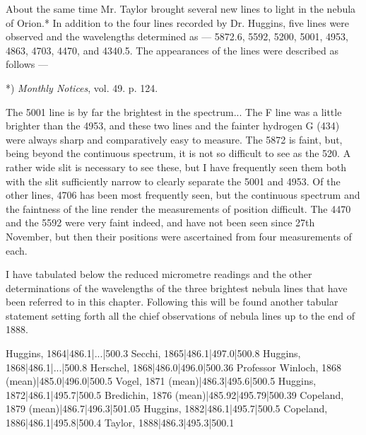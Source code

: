 \documentclass[a4paper, 12pt, oneside, polutonikogreek, english]{article}
\begin{document}
About the same time Mr. Taylor brought several new lines to light in the nebula of Orion.* In addition to the four lines recorded by Dr. Huggins, five lines were observed and the wavelengths determined as --- 5872.6, 5592, 5200, 5001, 4953, 4863, 4703, 4470, and 4340.5. The appearances of the lines were described as follows ---

*) \emph{Monthly Notices}, vol. 49. p. 124.

The 5001 line is by far the brightest in the spectrum... The F line was a little brighter than the 4953, and these two lines and the fainter hydrogen G (434) were always sharp and comparatively easy to measure. The 5872 is faint, but, being beyond the continuous spectrum, it is not so difficult to see as the 520. A rather wide slit is necessary to see these, but I have frequently seen them both with the slit sufficiently narrow to clearly separate the 5001 and 4953. Of the other lines, 4706 has been most frequently seen, but the continuous spectrum and the faintness of the line render the measurements of position difficult. The 4470 and the 5592 were very faint indeed, and have not been seen since 27th November, but then their positions were ascertained from four measurements of each.

I have tabulated below the reduced micrometre readings and the other determinations of the wavelengths of the three brightest nebula lines that have been referred to in this chapter. Following this will be found another tabular statement setting forth all the chief observations of nebula lines up to the end of 1888.

Huggins, 1864|486.1|...|500.3 
Secchi, 1865|486.1|497.0|500.8 
Huggins, 1868|486.1|...|500.8 
Herschel, 1868|486.0|496.0|500.36 
Professor Winloch, 1868 (mean)|485.0|496.0|500.5 
Vogel, 1871 (mean)|486.3|495.6|500.5 
Huggins, 1872|486.1|495.7|500.5 
Bredichin, 1876 (mean)|485.92|495.79|500.39 
Copeland, 1879 (mean)|486.7|496.3|501.05 
Huggins, 1882|486.1|495.7|500.5 
Copeland, 1886|486.1|495.8|500.4 
Taylor, 1888|486.3|495.3|500.1
\end{document}
